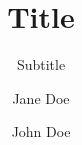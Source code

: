 \documentclass{charite}
\author{Jane Doe \and 
	John Doe %
}
\title{Title}
\subtitle{Subtitle}
\begin{document}
    
	\charitetitle
\end{document}
